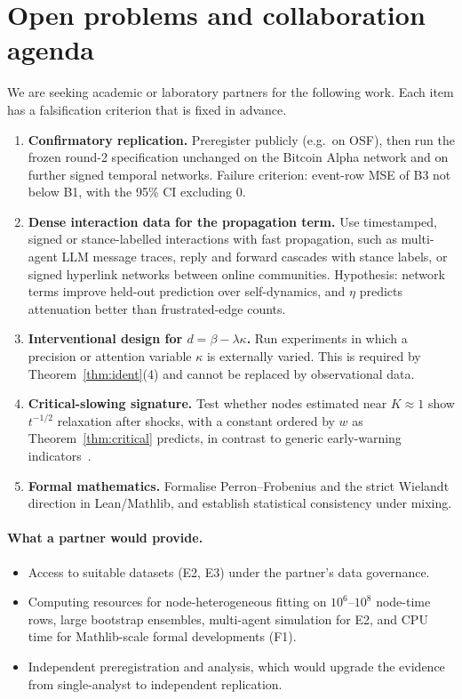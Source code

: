 \documentclass[11pt]{article}
\theoremstyle{definition}
\theoremstyle{remark}
\begin{document}
\section{Open problems and collaboration agenda}\label{sec:agenda}

We are seeking academic or laboratory partners for the following work. Each item has a falsification
criterion that is fixed in advance.

\begin{enumerate}
\item[\textbf{E1}] \textbf{Confirmatory replication.} Preregister publicly (e.g.\ on OSF), then run the
      frozen round-2 specification unchanged on
      the Bitcoin Alpha network and on further signed temporal networks. Failure criterion: event-row
      MSE of B3 not below B1, with the 95\% CI excluding 0.
\item[\textbf{E2}] \textbf{Dense interaction data for the propagation term.} Use timestamped, signed or
      stance-labelled interactions with fast propagation, such as multi-agent LLM message traces,
      reply and forward cascades with stance labels, or signed hyperlink networks between online
      communities. Hypothesis: network terms improve held-out prediction over self-dynamics, and
      $\eta$ predicts attenuation better than frustrated-edge counts.
\item[\textbf{E3}] \textbf{Interventional design for $d=\beta-\lambda\kappa$.} Run experiments in which a
      precision or attention variable $\kappa$ is externally varied. This is required by
      Theorem~\ref{thm:ident}(4) and cannot be replaced by observational data.
\item[\textbf{E4}] \textbf{Critical-slowing signature.} Test whether nodes estimated near $K\approx1$ show
      $t^{-1/2}$ relaxation after shocks, with a constant ordered by $w$ as Theorem~\ref{thm:critical}
      predicts, in contrast to generic early-warning indicators~\cite{scheffer2009}.
\item[\textbf{F1}] \textbf{Formal mathematics.} Formalise Perron--Frobenius and the strict Wielandt
      direction in Lean/Mathlib, and establish statistical consistency under mixing.
\end{enumerate}

\paragraph{What a partner would provide.}
\begin{itemize}
\item Access to suitable datasets (E2, E3) under the partner's data governance.
\item Computing resources for node-heterogeneous fitting on $10^6$--$10^8$ node-time rows, large
      bootstrap ensembles, multi-agent simulation for E2, and CPU time for Mathlib-scale formal
      developments (F1).
\item Independent preregistration and analysis, which would upgrade the evidence from single-analyst
      to independent replication.
\end{itemize}
\end{document}
